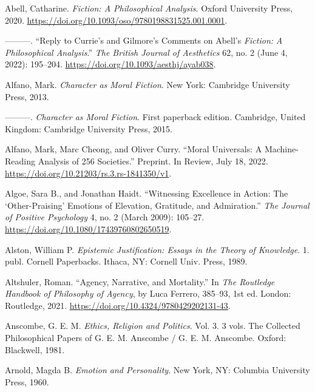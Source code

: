 \documentclass[phdthesis,12pt,final]{wuthesis}
\newlength{\cslhangindent}
\newenvironment{CSLReferences}[2] %
{\begin{list}{}{%
	\setlength{\itemindent}{0pt}
	\setlength{\leftmargin}{0pt}
	\setlength{\parsep}{0pt}
	\ifodd #1
	\setlength{\leftmargin}{\cslhangindent}
	\setlength{\itemindent}{-1\cslhangindent}
	\fi
	\setlength{\itemsep}{#2\baselineskip}}}
{\end{list}}
\theoremstyle{definition}
\theoremstyle{definition}
\theoremstyle{definition}
\theoremstyle{definition}
\theoremstyle{remark}
\begin{document}
\label{refs}
\begin{CSLReferences}{1}{0}
Abell, Catharine. \emph{Fiction: {A Philosophical Analysis}}. Oxford University Press, 2020. \url{https://doi.org/10.1093/oso/9780198831525.001.0001}.

---------. {``Reply to {Currie}'s and {Gilmore}'s Comments on {Abell}'s {\emph{Fiction}}{\emph{:} }{\emph{A Philosophical Analysis}}.''} \emph{The British Journal of Aesthetics} 62, no. 2 (June 4, 2022): 195--204. \url{https://doi.org/10.1093/aesthj/ayab038}.

Alfano, Mark. \emph{Character as Moral Fiction}. New York: Cambridge University Press, 2013.

---------. \emph{Character as Moral Fiction}. First paperback edition. Cambridge, United Kingdom: Cambridge University Press, 2015.

Alfano, Mark, Marc Cheong, and Oliver Curry. {``Moral {Universals}: {A} Machine-Reading Analysis of 256 Societies.''} Preprint. In Review, July 18, 2022. \url{https://doi.org/10.21203/rs.3.rs-1841350/v1}.

Algoe, Sara B., and Jonathan Haidt. {``Witnessing Excellence in Action: The {`Other-Praising'} Emotions of Elevation, Gratitude, and Admiration.''} \emph{The Journal of Positive Psychology} 4, no. 2 (March 2009): 105--27. \url{https://doi.org/10.1080/17439760802650519}.

Alston, William P. \emph{Epistemic Justification: Essays in the Theory of Knowledge}. 1. publ. Cornell Paperbacks. Ithaca, NY: Cornell Univ. Press, 1989.

Altshuler, Roman. {``Agency, Narrative, and Mortality.''} In \emph{The {Routledge Handbook} of {Philosophy} of {Agency}}, by Luca Ferrero, 385--93, 1st ed. London: Routledge, 2021. \url{https://doi.org/10.4324/9780429202131-43}.

Anscombe, G. E. M. \emph{Ethics, Religion and Politics}. Vol. 3. 3 vols. The Collected Philosophical Papers of {G}. {E}. {M}. {Anscombe} / {G}. {E}. {M}. {Anscombe}. Oxford: Blackwell, 1981.

Arnold, Magda B. \emph{Emotion and {Personality}}. New York, NY: Columbia University Press, 1960.


\end{CSLReferences}
\end{document}
